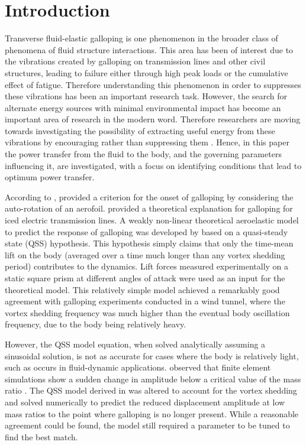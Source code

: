 \section{Introduction} 
 
Transverse fluid-elastic galloping is one phenomenon in the broader class of phenomena of fluid structure interactions. This area has been of interest due to the vibrations created by galloping on transmission lines \citep{Parkinson1964} and other civil structures, leading to failure either through high peak loads or the cumulative effect of fatigue. Therefore understanding this phenomenon in order to suppresses these vibrations has been an important research task. However, the search for alternate energy sources with minimal environmental impact has become an important area of research in the modern word. Therefore researchers are moving towards investigating the possibility of extracting useful energy from these vibrations by encouraging rather than suppressing them \citep{Barrero-Gil2010a}. Hence, in this paper the power transfer from the fluid to the body, and the governing parameters influencing it, are investigated, with a focus on identifying conditions that lead to optimum power transfer.

According to \citet{Paidoussis2010}, \citet{Glauert1919} provided a criterion for the onset of galloping by considering the auto-rotation of an aerofoil.  \citet{DenHartog1956} provided a theoretical explanation for galloping for iced electric transmission lines. A weakly non-linear theoretical aeroelastic model to predict the response of galloping was developed by \citet{Parkinson1964} based on a quasi-steady state (QSS) hypothesis. This hypothesis simply claims that only the time-mean lift on the body (averaged over a time much longer than any vortex shedding period) contributes to the dynamics. Lift forces measured experimentally on a static square prism at different angles of attack were used as an input for the theoretical model. This relatively simple model achieved a remarkably good agreement with galloping experiments conducted in a wind tunnel, where the vortex shedding frequency was much higher than the eventual body oscillation frequency, due to the body being relatively heavy.

However, the QSS model equation, when solved analytically assuming a sinusoidal solution, is not as accurate for cases where the body is relatively light, such as occurs in fluid-dynamic applications. \citet{Joly2012} observed that finite element simulations show a sudden change in amplitude below a critical value of the mass ratio \mstar. The QSS model derived in \citet{Parkinson1964} was altered to account for the vortex shedding and solved numerically to predict the reduced displacement amplitude at low mass ratios to the point where galloping is no longer present. While a reasonable agreement could be found, the model still required a parameter to be tuned to find the best match. 

